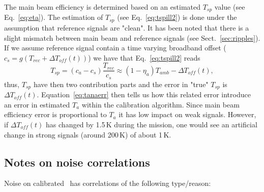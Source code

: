 The main beam efficiency is determined based on an estimated
\(T_{sp}\) value (see Eq.~\ref{eq:eta}).
The estimation of \(T_{sp}\) (see Eq.~\ref{eq:tspill2}) 
is done under the assumption that reference signals are "clean".
It has been noted that there is a slight mismatch between
main beam and reference signals (see Sect.~\ref{sec:ripples}).
If we assume reference signal contain a time varying
broadband offset (\(c_{s}=g(T_{rec}+\Delta T_{off}(t))\)) 
we have that Eq.~\ref{eq:tspill2} reads
\begin{equation}
 T_{sp}=(c_{a}-c_{s})\frac{T_{rec}}{c_{s}}\approx(1-\eta_{a})T_{amb}-\Delta T_{off}(t),
\end{equation}
thus, \(T_{sp}\) have then two contribution parts and the error
in "true" \(T_{sp}\) is \(\Delta T_{off}(t)\).
Equation~\ref{eq:tanaerr} then tells us how this related
error introduce an error in estimated \(T_{a}\) within the calibration algorithm.
Since main beam efficiency error is proportional to \(T_{a}\) it has low impact
on weak signals. However, if \(\Delta T_{off}(t)\) has changed by 1.5\,K
during the mission, one would see an artificial change in strong 
signals (around 200\,K) of about 1\,K. 




\subsection{Notes on noise correlations}
\label{notesoncorr}

Noise on calibrated \smr\ has correlations of the following type/reason:

